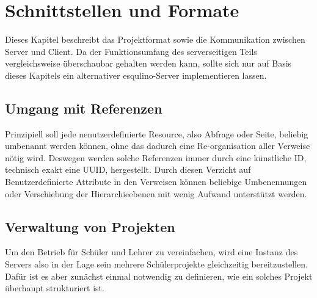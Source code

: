 \section{Schnittstellen und Formate}

Dieses Kapitel beschreibt das Projektformat sowie die Kommunikation zwischen Server und Client. Da der Funktionsumfang des serverseitigen Teils vergleichsweise überschaubar gehalten werden kann, sollte sich nur auf Basis dieses Kapitels ein alternativer esqulino-Server implementieren lassen.

\subsection{Umgang mit Referenzen}

Prinzipiell soll jede nenutzerdefinierte Resource, also Abfrage oder Seite, beliebig umbenannt werden können, ohne das dadurch eine Re-organisation aller Verweise nötig wird. Deswegen werden solche Referenzen immer durch eine künstliche ID, technisch exakt eine UUID, hergestellt. Durch diesen Verzicht auf Benutzerdefinierte Attribute in den Verweisen können beliebige Umbenennungen oder Verschiebung der Hierarchieebenen mit wenig Aufwand unterstützt werden.

\subsection{Verwaltung von Projekten}

Um den Betrieb für Schüler und Lehrer zu vereinfachen, wird eine Instanz des Servers also in der Lage sein mehrere Schülerprojekte gleichzeitig bereitzustellen. Dafür ist es aber zunächst einmal notwendig zu definieren, wie ein solches Projekt überhaupt strukturiert ist.



